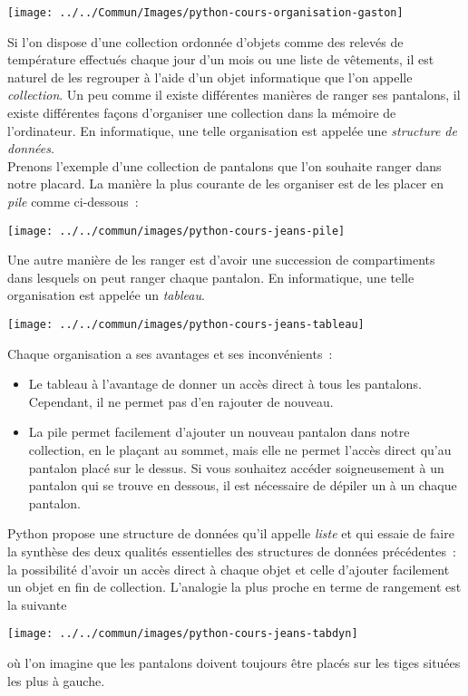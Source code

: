 \documentclass{magnolia}
\begin{document}
\hfill\texttt{[image: ../../Commun/Images/python-cours-organisation-gaston]}

\magtoc

\bigskip

Si l'on dispose d'une collection ordonnée d'objets comme des relevés de température effectués
chaque jour d'un mois ou une liste de vêtements, il est naturel de les regrouper à l'aide d'un objet
informatique que l'on appelle \emph{collection}. Un peu comme il existe différentes manières de
ranger ses pantalons, il existe différentes façons d'organiser une collection dans
la mémoire de l'ordinateur. En informatique, une telle organisation est appelée une
\emph{structure de données}.\\

Prenons l'exemple d'une collection de pantalons que l'on souhaite ranger dans notre placard. La manière
la plus courante de les organiser est de les placer en \emph{pile} comme ci-dessous~:
\begin{center}
\texttt{[image: ../../commun/images/python-cours-jeans-pile]}
\end{center}
Une autre manière de les ranger est d'avoir une succession de compartiments
dans lesquels on peut ranger chaque pantalon. En informatique, une telle organisation est appelée
un \emph{tableau}.
\begin{center}
\texttt{[image: ../../commun/images/python-cours-jeans-tableau]}
\end{center}
Chaque organisation a ses avantages et ses inconvénients~:
\begin{itemize}
\item Le tableau à l'avantage de donner un accès direct à tous les pantalons. Cependant, il ne permet
  pas d'en rajouter de nouveau.
\item La pile permet facilement d'ajouter un nouveau pantalon dans notre collection, en
  le plaçant au sommet, mais elle ne permet l'accès direct qu'au pantalon placé sur le dessus.
  Si vous souhaitez accéder soigneusement à un pantalon qui se trouve en dessous, il est
  nécessaire de dépiler un à un chaque pantalon.
\end{itemize}
Python propose une structure de données qu'il appelle \emph{liste} et qui essaie de faire la synthèse
des deux qualités essentielles des structures de données précédentes~: la possibilité d'avoir un
accès direct à chaque objet et celle d'ajouter facilement un objet en fin de collection. L'analogie la plus
proche en terme de rangement est la suivante
\begin{center}
\texttt{[image: ../../commun/images/python-cours-jeans-tabdyn]}
\end{center}
où l'on imagine que les pantalons doivent toujours être placés sur les tiges situées les plus à gauche.
\end{document}
